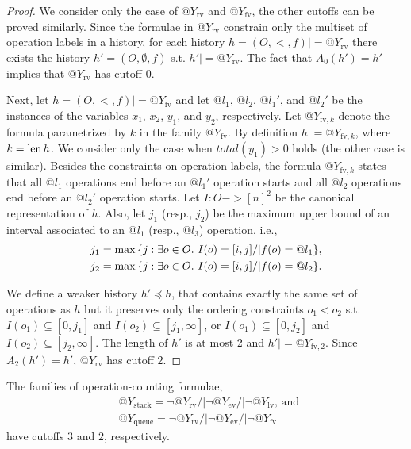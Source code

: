 \begin{proof}%

  We consider only the case of $@Y_\mathrm{rv}$ and $@Y_\mathrm{fv}$, the other
  cutoffs can be proved similarly.
  Since the formulae in $@Y_\mathrm{rv}$ constrain only the multiset of operation
  labels in a history, for each history $h=(O,<,f) |= @Y_\mathrm{rv}$ there
  exists the history $h'=(O,\emptyset,f)$ s.t. $h' |= @Y_\mathrm{rv}$. The
  fact that $A_0(h')=h'$ implies that $@Y_\mathrm{rv}$ has cutoff $0$.
 
  Next, let $h=(O,<,f) |= @Y_\mathrm{fv}$ and let $@l_1$, $@l_2$, $@l_1'$, and
  $@l_2'$ be the instances of the variables $x_1$, $x_2$, $y_1$, and $y_2$,
  respectively. Let $@Y_{\mathrm{fv},k}$ denote the formula parametrized by $k$ in the family $@Y_\mathrm{fv}$.
  By definition $h |=  @Y_{\mathrm{fv},k}$, where $k=\operatorname{len} h$.
  We consider only the case when $total(y_1)>0$ holds (the other
  case is similar). Besides the constraints on operation labels, the formula $@Y_{\mathrm{fv},k}$ 
  states that all $@l_1$ operations end before an $@l_1'$
  operation starts and all $@l_2$ operations end before an $@l_2'$ operation
  starts. Let $I:O->[n]^2$ be the canonical representation of $h$. Also, let
  $j_1$ (resp., $j_2$) be the maximum upper bound of an interval associated to
  an $@l_1$ (resp., $@l_3$) operation, i.e.,
  \begin{align*}
    j_1 = \max{\{ j:\exists o\in O.\ I(o) = [i,j] /| f(o)=@l_1 \}},\\
    j_2 = \max{\{ j:\exists o\in O.\ I(o) = [i,j] /| f(o)=@l_2 \}}.
  \end{align*}
 
  We define a weaker history $h'\preceq h$, that contains exactly the same set
  of operations as $h$ but it preserves only the ordering constraints $o_1<o_2$ s.t. 
  $I(o_1)\subseteq [0,j_1]$ and $I(o_2)\subseteq [j_1,\infty]$, or
  $I(o_1)\subseteq [0,j_2]$ and $I(o_2)\subseteq [j_2,\infty]$. The
  length of $h'$ is at most 2
  and $h'|= @Y_{\mathrm{fv},2}$. Since $A_2(h')=h'$, 
  $@Y_\mathrm{rv}$ has cutoff $2$.
\end{proof}

\begin{corollary}

  The families of operation-counting formulae,
  \begin{align*}
    & @Y_\mathrm{stack} = \lnot @Y_\mathrm{rv} /| \lnot @Y_\mathrm{ev} /| \lnot @Y_\mathrm{lv}
    \text{, and } \\
    & @Y_\mathrm{queue} = \lnot @Y_\mathrm{rv} /| \lnot @Y_\mathrm{ev} /| \lnot @Y_\mathrm{fv}
  \end{align*}
  have cutoffs $3$ and $2$, respectively.

\end{corollary}

